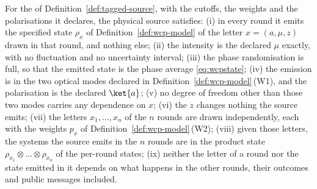 \begin{assumption}\label{ass:wcp}
For the  of Definition~\ref{def:tagged-source},
with the cutoffs, the weights and the polarisations it declares, the physical
source satisfies:
(i) in every round it emits the specified state $\rho_x$ of
Definition~\ref{def:wcp-model} of the letter $x=(a,\mu,z)$ drawn in that
round, and nothing else;
(ii) the intensity is the declared $\mu$ exactly, with no fluctuation and no
uncertainty interval;
(iii) the phase randomisation is full, so that the emitted state is the phase
average \eqref{eq:wcpstate};
(iv) the emission is in the two optical modes declared in
Definition~\ref{def:wcp-model}\,(W1), and the polarisation is the declared
$\ket{a}$;
(v) no degree of freedom other than those two modes carries any dependence on
$x$;
(vi) the  $z$ changes nothing the source emits;
(vii) the letters $x_1,\dots,x_n$ of the $n$ rounds are drawn independently,
each with the weights $p_x$ of Definition~\ref{def:wcp-model}\,(W2);
(viii) given those letters, the systems the source emits in the $n$ rounds
are in the product state $\rho_{x_1}\otimes\dots\otimes\rho_{x_n}$ of the
per-round states;
(ix) neither the letter of a round nor the state emitted in it depends on
what happens in the other rounds, their outcomes and public messages
included.
\end{assumption}
